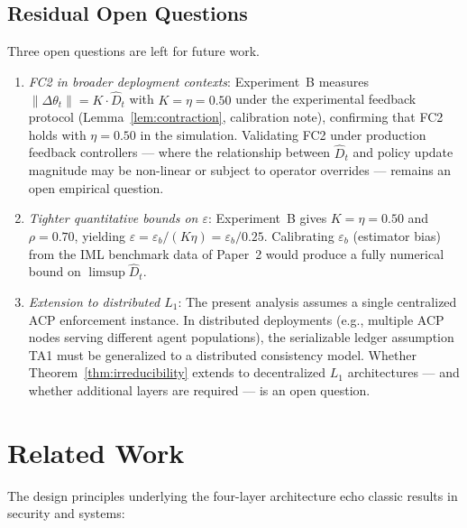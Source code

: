 \documentclass[11pt]{article}
\newcommand{\Dhat}{\widehat{D}}
\newcommand{\Layer}[1]{L_{#1}}
\begin{document}
\subsection{Residual Open Questions}

Three open questions are left for future work.

\begin{enumerate}[label=(\roman*),noitemsep]
  \item \emph{FC2 in broader deployment contexts}: Experiment~B measures
    $\|\Delta\theta_t\| = K \cdot \Dhat_t$ with $K = \eta = 0.50$ under
    the experimental feedback protocol (Lemma~\ref{lem:contraction},
    calibration note), confirming that FC2 holds with $\eta = 0.50$ in the
    simulation.  Validating FC2 under production feedback controllers ---
    where the relationship between $\Dhat_t$ and policy update magnitude
    may be non-linear or subject to operator overrides --- remains an open
    empirical question.

  \item \emph{Tighter quantitative bounds on $\varepsilon$}: Experiment~B
    gives $K = \eta = 0.50$ and $\rho = 0.70$, yielding
    $\varepsilon = \varepsilon_b / (K\eta) = \varepsilon_b / 0.25$.
    Calibrating $\varepsilon_b$ (estimator bias) from the IML benchmark
    data of Paper~2 would produce a fully numerical bound on $\limsup \Dhat_t$.

  \item \emph{Extension to distributed $\Layer{1}$}: The present analysis
    assumes a single centralized ACP enforcement instance. In distributed
    deployments (e.g., multiple ACP nodes serving different agent populations),
    the serializable ledger assumption TA1 must be generalized to a distributed
    consistency model. Whether Theorem~\ref{thm:irreducibility} extends to
    decentralized $\Layer{1}$ architectures --- and whether additional layers
    are required --- is an open question.
\end{enumerate}

\section{Related Work}
\label{sec:related}

The design principles underlying the four-layer architecture echo classic
results in security and systems:
\end{document}

